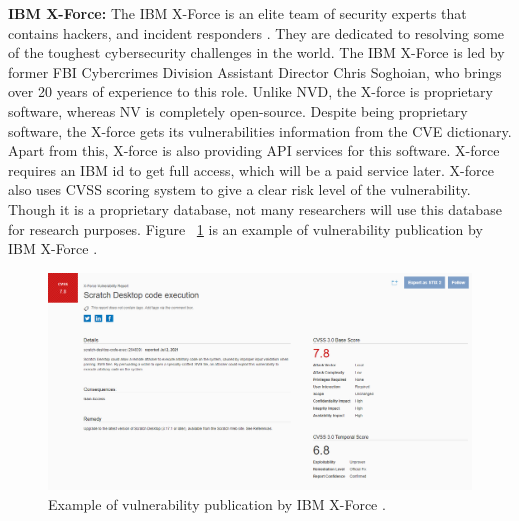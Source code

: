{\bf IBM X-Force:} The IBM X-Force is an elite team of security experts that contains hackers, and incident responders \cite{IbmXforce}. They are dedicated to resolving some of the toughest cybersecurity challenges in the world. The IBM X-Force is led by former FBI Cybercrimes Division Assistant Director Chris Soghoian, who brings over 20 years of experience to this role. Unlike \acs{NVD}, the X-force is proprietary software, whereas NV is completely open-source. Despite being proprietary software, the X-force gets its vulnerabilities information from the \acs{CVE} dictionary. Apart from this, X-force is also providing API services for this software. X-force requires an IBM id to get full access, which will be a paid service later. X-force also uses \acs{CVSS} scoring system to give a clear risk level of the vulnerability. Though it is a proprietary database, not many researchers will use this database for research purposes. Figure ~\ref{fig:ibm} is an example of vulnerability publication by IBM X-Force \cite{IbmXforce}.
\newpage
\begin{figure}[H]
	\includegraphics[width=15cm]{includes/ibm.png}
	\centering
	\caption{Example of vulnerability publication by IBM X-Force \cite{IbmXforce}.}
	\label{fig:ibm}
\end{figure}


